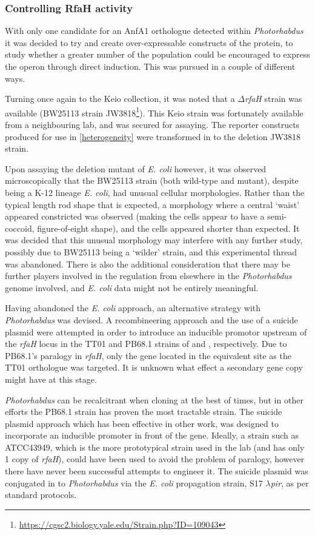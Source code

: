 \clearpage
\subsubsection{Controlling RfaH activity}
With only one candidate for an AnfA1 orthologue detected within \emph{Photorhabdus} it was decided to try and create over-expressable constructs of the protein, to study whether a greater number of the population could be encouraged to express the operon through direct induction. This was pursued in a couple of different ways.

Turning once again to the Keio collection, it was noted that a $\Delta$\emph{rfaH} strain was available (BW25113 strain JW3818\footnote{\url{https://cgsc2.biology.yale.edu/Strain.php?ID=109043}})\citep{Baba2006}. This Keio strain was fortunately available from a neighbouring lab, and was secured for assaying. The reporter constructs produced for use in \vref{heterogeneity} were transformed in to the deletion JW3818 strain.

Upon assaying the deletion mutant of \emph{E. coli} however, it was observed microscopically that the BW25113 strain (both wild-type and mutant), despite being a K-12 lineage \emph{E. coli}, had unusual cellular morphologies. Rather than the typical length rod shape that is expected, a morphology where a central `waist' appeared constricted was observed (making the cells appear to have a semi-coccoid, figure-of-eight shape), and the cells appeared shorter than expected. It was decided that this unusual morphology may interfere with any further study, possibly due to BW25113 being a `wilder' strain, and this experimental thread was abandoned. There is also the additional consideration that there may be further players involved in the regulation from elsewhere in the \emph{Photorhabdus} genome involved, and \emph{E. coli} data might not be entirely meaningful.

Having abandoned the \emph{E. coli} approach, an alternative strategy with \emph{Photorhabdus} was devised. A recombineering approach and the use of a suicide plasmid were attempted in order to introduce an inducible promotor upstream of the \emph{rfaH} locus in the TT01 and PB68.1 strains of \Plum{} and \Pasy, respectively. Due to \Pasy{} PB68.1's paralogy in \emph{rfaH}, only the gene located in the equivalent site as the TT01 orthologue was targeted. It is unknown what effect a secondary gene copy might have at this stage.

\emph{Photorhabdus} can be recalcitrant when cloning at the best of times, but in other efforts the PB68.1 strain has proven the most tractable \Pasy{} strain. The suicide plasmid approach which has been effective in other work, was designed to incorporate an inducible promoter in front of the gene. Ideally, a \Pasy{} strain such as ATCC43949, which is the more prototypical \Pasy{} strain used in the lab (and has only 1 copy of \emph{rfaH}), could have been used to avoid the problem of paralogy, however there have never been successful attempts to engineer it. The suicide plasmid was conjugated in to \emph{Photorhabdus} via the \emph{E. coli} propagation strain, S17 $\lambda$\emph{pir}, as per standard protocols.

